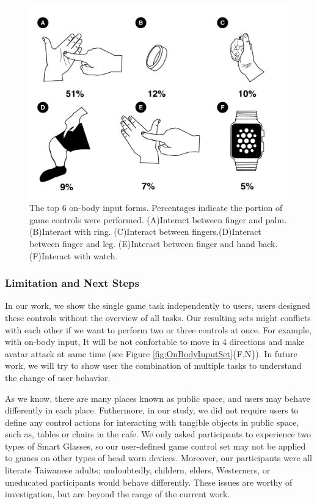 \documentclass{sigchi}
\begin{document}
 \begin{figure}[!h]
  \centering
  \includegraphics[width=1\columnwidth]{OnBodyForms.pdf}
  \caption{The top 6 on-body input forms. Percentages indicate the portion of game controls were performed. (A)Interact between finger and palm. (B)Interact with ring. (C)Interact between fingers.(D)Interact between finger and leg. (E)Interact between finger and hand back. (F)Interact with watch.}
  \label{fig:figureOnBodyPorpotion}
  \end{figure}   

  \subsubsection{Limitation and Next Steps}

  In our work, we show the single game task independently to users, users designed these controls without the overview of all tasks. Our resulting sets might conflicts with each other if we want to perform two or three controls at once. For example, with on-body input, It will be not confortable to move in 4 directions and make avatar attack at same time (see Figure \ref{fig:OnBodyInputSet}\{F,N\}). In future work, we will try to show user the combination of multiple tasks to understand the change of user behavior.

  As we know, there are many places known as public space, and users may behave differently in each place. Futhermore, in our study, we did not require users to define any control actions for interacting with tangible objects in public space, such as, tables or chairs in the cafe. We only asked participants to experience two types of Smart Glasses, so our user-defined game control set may not be applied to games on other types of head worn devices. Moreover, our participants were all literate Taiwanese adults; undoubtedly, childern, elders, Westerners, or uneducated participants would behave differently. These issues are worthy of investigation, but are beyond the range of the current work.
\end{document}
